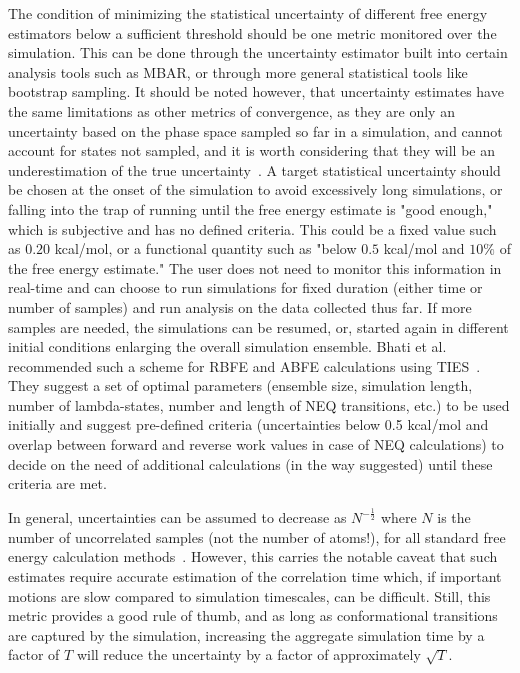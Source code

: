 The condition of minimizing the statistical uncertainty of different free energy estimators below a sufficient threshold should be one metric monitored over the simulation. This can be done through the uncertainty estimator built into certain analysis tools such as MBAR, or through more general statistical tools like bootstrap sampling. It should be noted however, that uncertainty estimates have the same limitations as other metrics of convergence, as they are only an uncertainty based on the phase space sampled so far in a simulation, and cannot account for states not sampled, and it is worth considering that they will be an underestimation of the true uncertainty~\cite{wan2020fep+, wan2021uq, vassaux2021, gapsys2020large, wade2022, bhati2017, bhati2022, bhati2025, wan2023eqvsneq, bhati2018, bhati2019, cournia2017relative, gapsys2021accurate, baumann2021challenges, caves1998locally}.
A target statistical uncertainty should be chosen at the onset of the simulation to avoid excessively long simulations, or falling into the trap of running until the free energy estimate is "good enough," which is subjective and has no defined criteria. This could be a fixed value such as $0.20$ kcal/mol, or a functional quantity such as "below $0.5$ kcal/mol and $10\%$ of the free energy estimate." The user does not need to monitor this information in real-time and can choose to run simulations for fixed duration (either time or number of samples) and run analysis on the data collected thus far. If more samples are needed, the simulations can be resumed, or, started again in different initial conditions enlarging the overall simulation ensemble. 
Bhati et al. recommended such a scheme for RBFE and ABFE calculations using TIES~\cite{bhati2022, bhati2025, wan2023eqvsneq, coveney2022corners}. They suggest a set of optimal parameters (ensemble size, simulation length, number of lambda-states, number and length of NEQ transitions, etc.) to be used initially and suggest pre-defined criteria (uncertainties below 0.5 kcal/mol and overlap between forward and reverse work values in case of NEQ calculations) to decide on the need of additional calculations (in the way suggested) until these criteria are met.

In general, uncertainties can be assumed to decrease as $N^{-\frac{1}{2}}$ where $N$ is the number of uncorrelated samples (not the number of atoms!), for all standard free energy calculation methods~\cite{shirts2005comparison}. However, this carries the notable caveat that such estimates require accurate estimation of the correlation time which, if important motions are slow compared to simulation timescales, can be difficult. Still, this metric provides a good rule of thumb, and as long as conformational transitions are captured by the simulation, increasing the aggregate simulation time by a factor of $T$ will reduce the uncertainty by a factor of approximately $\sqrt{T}$.

